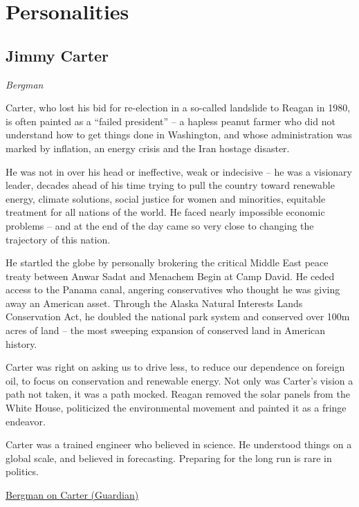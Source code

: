 \documentclass[
]{book}
\begin{document}
\hypertarget{personalities}{%
\section{Personalities}\label{personalities}}

\hypertarget{jimmy-carter}{%
\subsection{Jimmy Carter}\label{jimmy-carter}}

\emph{Bergman}

Carter, who lost his bid for re-election in a so-called landslide to Reagan in 1980, is often painted as a ``failed president'' -- a hapless peanut farmer who did not understand how to get things done in Washington, and whose administration was marked by inflation, an energy crisis and the Iran hostage disaster.

He was not in over his head or ineffective, weak or indecisive -- he was a visionary leader, decades ahead of his time trying to pull the country toward renewable energy, climate solutions, social justice for women and minorities, equitable treatment for all nations of the world. He faced nearly impossible economic problems -- and at the end of the day came so very close to changing the trajectory of this nation.

He startled the globe by personally brokering the critical Middle East peace treaty between Anwar Sadat and Menachem Begin at Camp David. He ceded access to the Panama canal, angering conservatives who thought he was giving away an American asset. Through the Alaska Natural Interests Lands Conservation Act, he doubled the national park system and conserved over 100m acres of land -- the most sweeping expansion of conserved land in American history.

Carter was right on asking us to drive less, to reduce our dependence on foreign oil, to focus on conservation and renewable energy. Not only was Carter's vision a path not taken, it was a path mocked. Reagan removed the solar panels from the White House, politicized the environmental movement and painted it as a fringe endeavor.

Carter was a trained engineer who believed in science.
He understood things on a global scale, and believed in forecasting.
Preparing for the long run is rare in politics.

\href{https://www.theguardian.com/us-news/2021/may/03/jimmy-carter-climate-change-carterland-film-biography}{Bergman on Carter (Guardian)}
\end{document}
